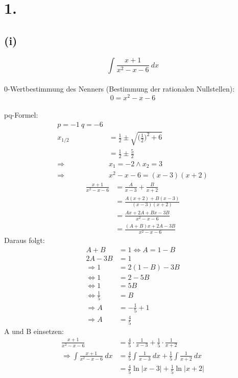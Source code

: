 \documentclass[a4paper]{scrartcl}
\title{\titleinfo}
\author{Elena Noll, Sven-Hendrik Haase, Arne Struck}
\date{\today}
\begin{document}
\maketitle

\section{1.}
\subsection{(i)}

\[\int \frac{x+1}{x^2 -x-6}\ dx\]\\
0-Wertbestimmung des Nenners (Bestimmung der rationalen Nullstellen):
\[0=x^2 -x-6\]\\
pq-Formel:
\begin{align}
p=-1\ q=-6\\
x_{1/2}&=\frac{1}{2}\pm \sqrt{\Big(\frac{1}{2}\Big)^2 +6}\\
  &=\frac{1}{2}\pm \frac{5}{2}\\
	\Rightarrow & x_1 =-2 \land x_2 =3\\
	\Rightarrow & x^2-x-6=(x-3)(x+2)
\end{align}
\begin{align}
\frac{x+1}{x^2 -x-6}&= \frac{A}{x-3}+\frac{B}{x+2}\\
	&=\frac{A(x+2)+B(x-3)}{(x-3)(x+2)}\\
	&=\frac{Ax+2A+Bx-3B}{x^2 -x-6}\\
	&=\frac{(A+B)x+2A-3B}{x^2 -x-6}
\end{align}
Daraus folgt:
\begin{align}
A+B &= 1 \Leftrightarrow A=1-B\\
2A-3B &= 1\\
\Rightarrow 1&=2(1-B)-3B\\
	\Leftrightarrow 1&=2-5B\\
	\Leftrightarrow 1&=5B\\
	\Leftrightarrow \frac{1}{5} &= B\\
	\Rightarrow A&=-\frac{1}{5}+1\\
	\Rightarrow A&=\frac{4}{5}
\end{align}
A und B einsetzen:
\begin{align}
\frac{x+1}{x^2 -x-6}&=\frac{4}{5}\cdot \frac{1}{x-3}+\frac{1}{5}\cdot\frac{1}{x+2}\\
\Rightarrow	\int \frac{x+1}{x^2 -x-6}\ dx &=\frac{4}{5}\int\frac{1}{x-3}\ dx+\frac{1}{5}\int\frac{1}{x+2}\ dx\\
	&=\frac{4}{5}\ln |x-3|+\frac{1}{5}\ln |x+2|
\end{align}
\end{document}
